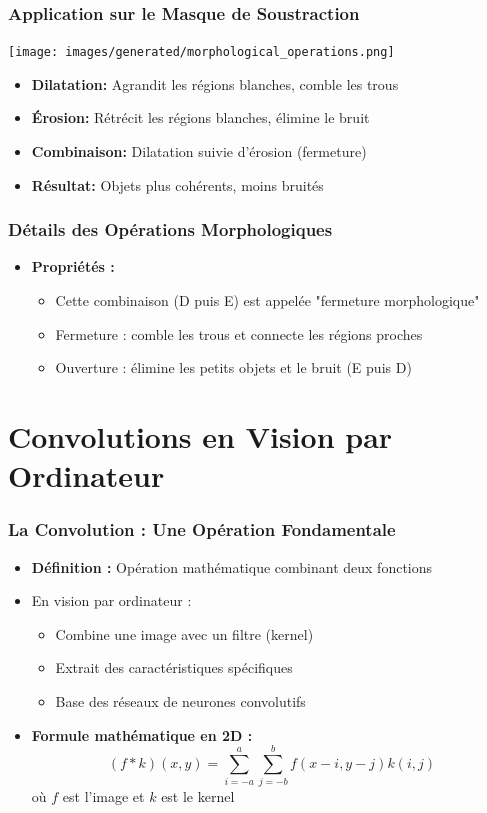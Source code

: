 \documentclass{beamer}
\begin{document}
\begin{frame}
    \frametitle{Application sur le Masque de Soustraction}
    \begin{center}
        \texttt{[image: images/generated/morphological\_operations.png]}
    \end{center}
    \begin{itemize}
        \item \textbf{Dilatation:} Agrandit les régions blanches, comble les trous
        \item \textbf{Érosion:} Rétrécit les régions blanches, élimine le bruit
        \item \textbf{Combinaison:} Dilatation suivie d'érosion (fermeture)
        \item \textbf{Résultat:} Objets plus cohérents, moins bruités
    \end{itemize}
\end{frame}

\begin{frame}
    \frametitle{Détails des Opérations Morphologiques}
    \begin{itemize}
        \item \textbf{Propriétés :}
        \begin{itemize}
            \item Cette combinaison (D puis E) est appelée "fermeture morphologique"
            \item Fermeture : comble les trous et connecte les régions proches
            \item Ouverture : élimine les petits objets et le bruit (E puis D)
        \end{itemize}
    \end{itemize}
\end{frame}

\section{Convolutions en Vision par Ordinateur}

\begin{frame}
    \frametitle{La Convolution : Une Opération Fondamentale}
    \begin{itemize}
        \item \textbf{Définition :} Opération mathématique combinant deux fonctions
        \item En vision par ordinateur : 
        \begin{itemize}
            \item Combine une image avec un filtre (kernel)
            \item Extrait des caractéristiques spécifiques
            \item Base des réseaux de neurones convolutifs
        \end{itemize}
        \item \textbf{Formule mathématique en 2D :}
        \[ (f * k)(x,y) = \sum_{i=-a}^a \sum_{j=-b}^b f(x-i,y-j)k(i,j) \]
        où \(f\) est l'image et \(k\) est le kernel
    \end{itemize}
\end{frame}
\end{document}
